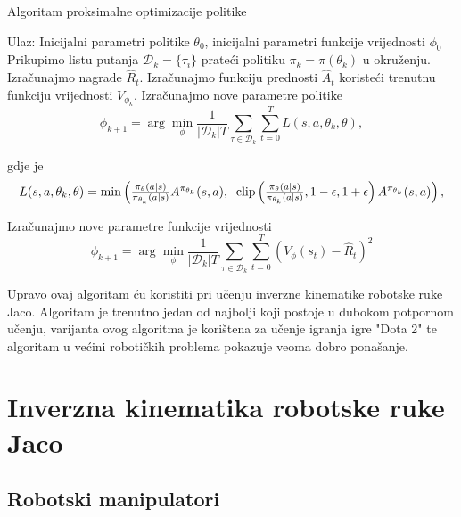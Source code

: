 \documentclass[times,utf8,diplomski]{fer}
\begin{document}
\begin{algorithm}[H]
	\caption{Algoritam proksimalne optimizacije politike}
	\label{ppo2}
	\begin{algorithmic}[1]
		\STATE Ulaz:  Inicijalni parametri politike $\theta_0$, inicijalni parametri funkcije vrijednosti $\phi_0$
		\STATE Prikupimo listu putanja ${\mathcal D}_k = \{\tau_i\}$ prateći politiku $\pi_k = \pi(\theta_k)$ u okruženju.
		\STATE Izračunajmo nagrade $\hat{R}_t$.
		\STATE Izračunajmo funkciju prednosti $\hat{A}_t$ koristeći trenutnu funkciju vrijednosti $V_{\phi_k}$.
		\STATE Izračunajmo nove parametre politike
		\begin{equation*}
			\phi_{k+1} = \arg \min_{\phi} \frac{1}{|{\mathcal D}_k| T} \sum_{\tau \in {\mathcal D}_k} \sum_{t=0}^T L(s,a,\theta_k,\theta),
		\end{equation*}

		\noindent gdje je
		\begin{equation*}
			\resizebox{0.99\hsize}{!}{$L(s,a,\theta_k,\theta) = \min\left(
					\frac{\pi_{\theta}(a|s)}{\pi_{\theta_k}(a|s)}  A^{\pi_{\theta_k}}(s,a), \;\;
					\text{clip}\left(\frac{\pi_{\theta}(a|s)}{\pi_{\theta_k}(a|s)}, 1 - \epsilon, 1+\epsilon \right) A^{\pi_{\theta_k}}(s,a)
					\right),$}
		\end{equation*}

		\STATE Izračunajmo nove parametre funkcije vrijednosti
		\begin{equation*}
			\phi_{k+1} = \arg \min_{\phi} \frac{1}{|{\mathcal D}_k| T} \sum_{\tau \in {\mathcal D}_k} \sum_{t=0}^T\left( V_{\phi} (s_t) - \hat{R}_t \right)^2
		\end{equation*}
		\ENDFOR
	\end{algorithmic}
\end{algorithm}

\bigskip

Upravo ovaj algoritam ću koristiti pri učenju inverzne kinematike robotske ruke Jaco. Algoritam je trenutno jedan od najbolji koji postoje u dubokom potpornom učenju, varijanta ovog algoritma je korištena za učenje igranja igre "Dota 2" te algoritam u većini robotičkih problema pokazuje veoma dobro ponašanje.

\clearpage
\chapter{Inverzna kinematika robotske ruke Jaco}
\section{Robotski manipulatori}
\end{document}

